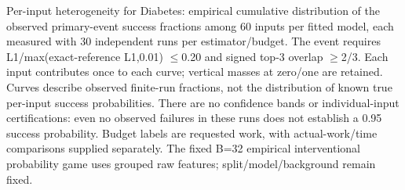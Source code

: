 Per-input heterogeneity for Diabetes: empirical cumulative distribution of the observed primary-event success fractions among 60 inputs per fitted model, each measured with 30 independent runs per estimator/budget. The event requires L1/max(exact-reference L1,0.01) $\leq$0.20 and signed top-3 overlap $\geq$2/3. Each input contributes once to each curve; vertical masses at zero/one are retained. Curves describe observed finite-run fractions, not the distribution of known true per-input success probabilities. There are no confidence bands or individual-input certifications: even no observed failures in these runs does not establish a 0.95 success probability. Budget labels are requested work, with actual-work/time comparisons supplied separately. The fixed B=32 empirical interventional probability game uses grouped raw features; split/model/background remain fixed.
